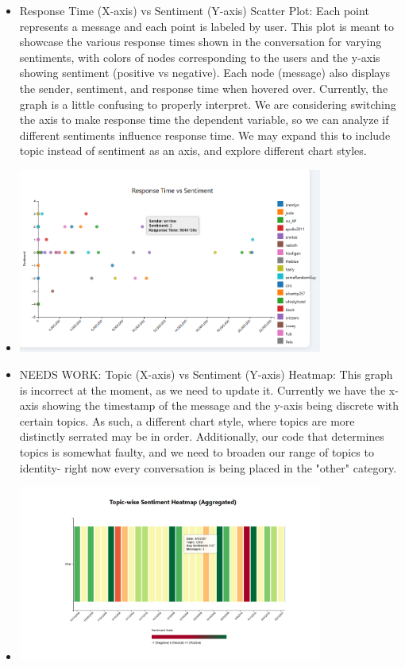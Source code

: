 \documentclass{article}\usepackage{graphicx}
\begin{document}
\begin{itemize}
    \item Response Time (X-axis) vs Sentiment (Y-axis) Scatter Plot: Each point represents a message and each point is labeled by user. This plot is meant to showcase the various response times shown in the conversation for varying sentiments, with colors of nodes corresponding to the users and the y-axis showing sentiment (positive vs negative). Each node (message) also displays the sender, sentiment, and response time when hovered over. Currently, the graph is a little confusing to properly interpret. We are considering switching the axis to make response time the dependent variable, so we can analyze if different sentiments influence response time. We may expand this to include topic instead of sentiment as an axis, and explore different chart styles.
    \item \includegraphics[width=10cm]{./Latex Images/Responsetime timeline ss.png}
    \item NEEDS WORK: Topic (X-axis) vs Sentiment (Y-axis) Heatmap: This graph is incorrect at the moment, as we need to update it. Currently we have the x-axis showing the timestamp of the message and the y-axis being discrete with certain topics. As such, a different chart style, where topics are more distinctly serrated may be in order. Additionally, our code that determines topics is somewhat faulty, and we need to broaden our range of topics to identity- right now every conversation is being placed in the "other" category. 
    \item \includegraphics[width=10cm]{./Latex Images/Sentiment heatmap ss.png}

\end{itemize}
\end{document}
